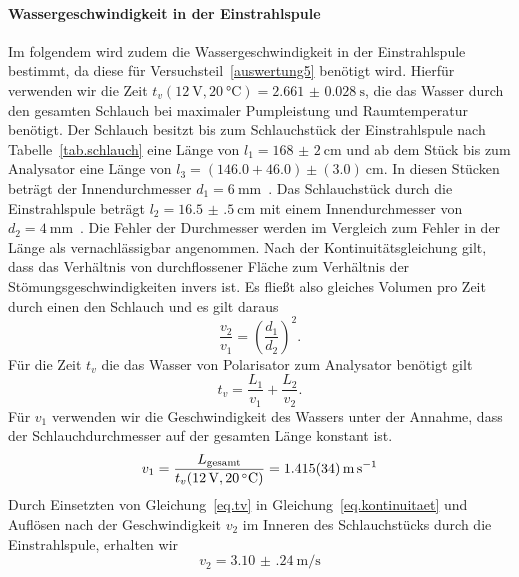 \documentclass[paper=a4,
	fontsize=10pt,
	DIV=18,
	twocolumn,
	parskip=half
	]{scrartcl}
\numberwithin{equation}{section}    %
\begin{document}
\paragraph*{Wassergeschwindigkeit in der Einstrahlspule}
Im folgendem wird zudem die Wassergeschwindigkeit in der Einstrahlspule bestimmt, da diese für Versuchsteil~\ref{auswertung5} benötigt wird.
Hierfür verwenden wir die Zeit $t_{v}(\SI{12}{\volt},\SI{20}{\celsius})= \SI{2.661(28)}{\second}$, die das Wasser durch den gesamten Schlauch bei maximaler Pumpleistung und Raumtemperatur benötigt. 
Der Schlauch besitzt bis zum Schlauchstück der Einstrahlspule nach Tabelle~\ref{tab.schlauch} eine Länge von $l_1 = \SI{168(2)}{\centi\meter}$ und ab dem Stück bis zum Analysator eine Länge von $l_3 = (146.0+46.0)\pm(3.0)\SI{}{\centi\meter}$. In diesen Stücken beträgt der Innendurchmesser $d_1 = \SI{6}{\milli\meter}$~\citep{anleitung}. Das Schlauchstück durch die Einstrahlspule beträgt $l_2 = \SI{16.5(5)}{\centi\meter}$ mit einem Innendurchmesser von $d_2 = \SI{4}{\milli\meter}$~\citep{anleitung}. Die Fehler der Durchmesser werden im Vergleich zum Fehler in der Länge als vernachlässigbar angenommen. 
Nach der Kontinuitätsgleichung gilt, dass das Verhältnis von durchflossener Fläche zum Verhältnis der Stömungsgeschwindigkeiten invers ist. Es fließt also gleiches Volumen pro Zeit durch einen den Schlauch und es gilt daraus
\begin{equation}
	\frac{v_2}{v_1} = \left(\frac{d_1}{d_2}\right)^2.
	\label{eq.kontinuitaet}
\end{equation}
Für die Zeit $t_v$ die das Wasser von Polarisator zum Analysator benötigt gilt
\begin{equation}
	t_v = \frac{L_1}{v_1} + \frac{L_2}{v_2}.
	\label{eq.tv}
\end{equation}
Für $v_1$ verwenden wir die Geschwindigkeit des Wassers unter der Annahme, dass der Schlauchdurchmesser auf der gesamten Länge konstant ist.
\begin{equation}
	v_1 = \frac{L_{\rm gesamt}}{t_{v}(\SI{12}{\volt},\SI{20}{\celsius})} = \SI{1.415(34)}{\meter\per\second}
\end{equation}
Durch Einsetzten von Gleichung~\eqref{eq.tv} in Gleichung~\eqref{eq.kontinuitaet} und Auflösen nach der Geschwindigkeit $v_2$ im Inneren des Schlauchstücks durch die Einstrahlspule, erhalten wir
\begin{equation}
	v_2 = \SI{3.10(24)}{\meter\per\second} %
\end{equation}
\end{document}
